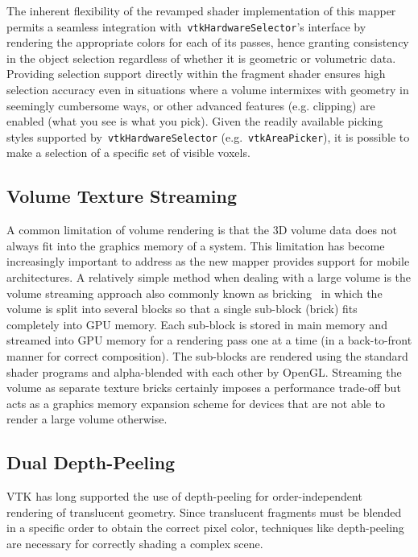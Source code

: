 The inherent flexibility of the revamped shader implementation of this mapper
permits a seamless integration with~\texttt{vtkHardwareSelector}'s interface by
rendering the appropriate colors for each of its passes, hence granting
consistency in the object selection regardless of whether it is geometric or
volumetric data.  Providing selection support directly within the fragment
shader ensures high selection accuracy even in situations where a volume
intermixes with geometry in seemingly cumbersome ways, or other advanced features
(e.g. clipping) are enabled (what you see is what you pick).  Given the readily
available picking styles supported by~\texttt{vtkHardwareSelector}
(e.g.~\texttt{vtkAreaPicker}), it is possible to make a selection of a specific
set of visible voxels.

\subsection{Volume Texture Streaming}
\label{streaming}
A common limitation of volume rendering is that the 3D volume data does not
always fit into the graphics memory of a system. This limitation has become
increasingly important to address as the new mapper provides support for mobile
architectures.  A relatively simple method when dealing with a large volume is
the volume streaming approach also commonly known as
bricking~\citep{engel_real-time_2006} in which the volume is split into several
blocks so that a single sub-block (brick) fits completely into GPU memory.  Each
sub-block is stored in main memory and streamed into GPU memory for a rendering
pass one at a time (in a back-to-front manner for correct composition). The
sub-blocks are rendered using the standard shader programs and alpha-blended
with each other by OpenGL. Streaming the volume as separate texture bricks
certainly imposes a performance trade-off but acts as a graphics memory
expansion scheme for devices that are not able to render a large volume
otherwise.

\subsection{Dual Depth-Peeling}
\label{peeling}
VTK has long supported the use of depth-peeling for order-independent rendering
of translucent geometry. Since translucent fragments must be blended in a
specific order to obtain the correct pixel color, techniques like depth-peeling
are necessary for correctly shading a complex scene.

